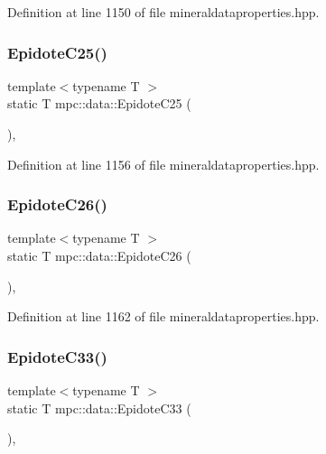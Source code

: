 Definition at line 1150 of file mineraldataproperties.\+hpp.

\mbox{\label{namespacempc_1_1data_a6ee4a451bed5b2584307f95aaad55736}} 
\subsubsection{\texorpdfstring{Epidote\+C25()}{EpidoteC25()}}
{\footnotesize\ttfamily template$<$typename T $>$ \\
static T mpc\+::data\+::\+Epidote\+C25 (\begin{DoxyParamCaption}{ }\end{DoxyParamCaption})\hspace{0.3cm}{\ttfamily [inline]}, {\ttfamily [static]}}



Definition at line 1156 of file mineraldataproperties.\+hpp.

\mbox{\label{namespacempc_1_1data_acf774b2a250a7deb1199844c0ef35ea4}} 
\subsubsection{\texorpdfstring{Epidote\+C26()}{EpidoteC26()}}
{\footnotesize\ttfamily template$<$typename T $>$ \\
static T mpc\+::data\+::\+Epidote\+C26 (\begin{DoxyParamCaption}{ }\end{DoxyParamCaption})\hspace{0.3cm}{\ttfamily [inline]}, {\ttfamily [static]}}



Definition at line 1162 of file mineraldataproperties.\+hpp.

\mbox{\label{namespacempc_1_1data_a1312eff0ffffc3bcdda6922338f28218}} 
\subsubsection{\texorpdfstring{Epidote\+C33()}{EpidoteC33()}}
{\footnotesize\ttfamily template$<$typename T $>$ \\
static T mpc\+::data\+::\+Epidote\+C33 (\begin{DoxyParamCaption}{ }\end{DoxyParamCaption})\hspace{0.3cm}{\ttfamily [inline]}, {\ttfamily [static]}}



